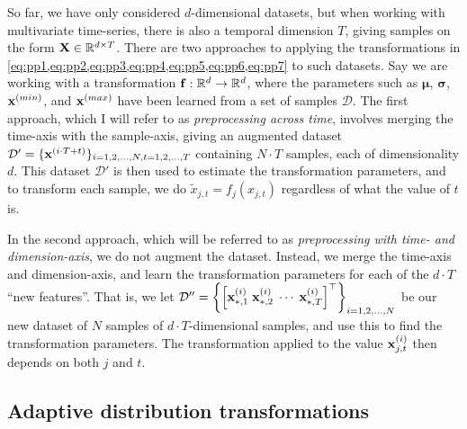 \documentclass{statsmsc}
\begin{document}
{So far, we have only considered $d$-dimensional datasets, but when working with multivariate
time-series, there is also a temporal dimension $T$, giving samples on the form
$\mathbf{X} \in \mathbb{R}^{d\times T}$. There are two approaches to applying the
transformations in \cref{eq:pp1,eq:pp2,eq:pp3,eq:pp4,eq:pp5,eq:pp6,eq:pp7}
to such datasets. Say we are working with a transformation $\mathbf{f}: \mathbb{R}^d \rightarrow {\mathbb{R}^d}$, where the
parameters such as $\bm\mu$, $\bm\sigma$, $\mathbf{x}^{(min)}$, and $\mathbf{x}^{(max)}$ have been learned
from a set of samples $\mathcal{D}$. The first approach, which I will refer to as
\textit{preprocessing across time}, involves merging the time-axis with the sample-axis, giving
an augmented dataset $\mathcal{D}'=\{\mathbf{x}^{(i\cdot T +t)}\}_{i=1,2,\dots,N,t=1,2,\dots,T}$
containing $N \cdot T$ samples, each of dimensionality $d$. This dataset $\mathcal{D}'$ is then
used to estimate the transformation parameters, and to transform each sample, we do
$\tilde{x}_{j,t}=f_j(x_{j,t})$ regardless of what the value of $t$ is.

In the second approach, which will be referred to as
\textit{preprocessing with time- and dimension-axis}, we do not augment the dataset. Instead,
we merge the time-axis and dimension-axis, and learn the transformation parameters for
each of the $d \cdot T$ ``new features''. That is, we let
$\mathcal{D}''=\left\{\left[\mathbf{x}^{(i)}_{*,1} \; \mathbf{x}^{(i)}_{*,2} \; \cdots \; \mathbf{x}^{(i)}_{*,T} \right]^\top \right\}_{i=1,2,\dots,N}$ be our new dataset of $N$ samples of $d\cdot T$-dimensional samples, and
use this to find the transformation parameters. The transformation applied to the value
$\mathbf{x}^{(i)}_{j,t}$ then depends on both $j$ and $t$.


\subsection{Adaptive distribution transformations}%
\label{sub:Adaptive distribution transformations}


}
\end{document}
